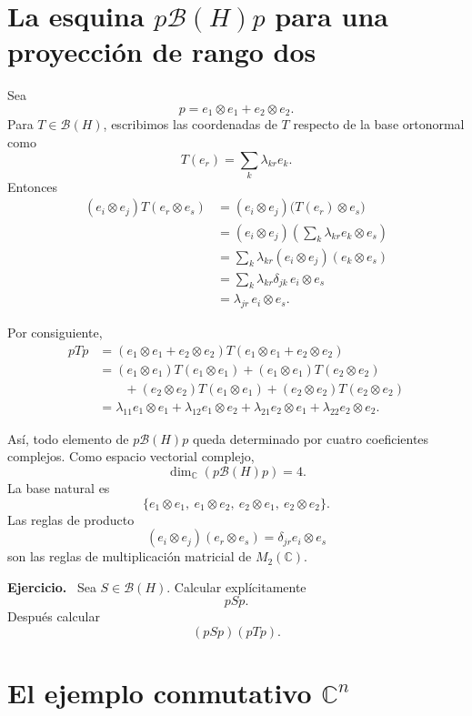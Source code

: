 \documentclass[11pt]{article}
\newcommand{\C}{\mathbb{C}}
\newcommand{\BH}{\mathcal{B}(H)}
\newenvironment{ejercicio}{\par\medskip\noindent\textbf{Ejercicio.}\ }{\par\medskip}
\begin{document}
\section{La esquina $p\mathcal{B}(H)p$ para una proyección de rango dos}

Sea
\[
p=e_1\otimes e_1+e_2\otimes e_2.
\]
Para $T\in\BH$, escribimos las coordenadas de $T$ respecto de la base ortonormal
como
\[
T(e_r)=\sum_k\lambda_{kr}e_k.
\]
Entonces
\begin{align*}
(e_i\otimes e_j)T(e_r\otimes e_s)
 &= (e_i\otimes e_j)\bigl(T(e_r)\otimes e_s\bigr)\\
 &= (e_i\otimes e_j)
    \left(\sum_k\lambda_{kr}e_k\otimes e_s\right)\\
 &=\sum_k\lambda_{kr}(e_i\otimes e_j)(e_k\otimes e_s)\\
 &=\sum_k\lambda_{kr}\delta_{jk}\,e_i\otimes e_s\\
 &=\lambda_{jr}\,e_i\otimes e_s.
\end{align*}

Por consiguiente,
\begin{align*}
pTp
 &= (e_1\otimes e_1+e_2\otimes e_2)
    T
    (e_1\otimes e_1+e_2\otimes e_2)\\
 &= (e_1\otimes e_1)T(e_1\otimes e_1)
  +(e_1\otimes e_1)T(e_2\otimes e_2)\\
 &\qquad
  +(e_2\otimes e_2)T(e_1\otimes e_1)
  +(e_2\otimes e_2)T(e_2\otimes e_2)\\
 &=\lambda_{11}e_1\otimes e_1
  +\lambda_{12}e_1\otimes e_2
  +\lambda_{21}e_2\otimes e_1
  +\lambda_{22}e_2\otimes e_2.
\end{align*}

Así, todo elemento de $p\BH p$ queda determinado por cuatro coeficientes
complejos. Como espacio vectorial complejo,
\[
\dim_{\C}(p\BH p)=4.
\]
La base natural es
\[
\{e_1\otimes e_1,\ e_1\otimes e_2,\ e_2\otimes e_1,\ e_2\otimes e_2\}.
\]
Las reglas de producto
\[
(e_i\otimes e_j)(e_r\otimes e_s)=\delta_{jr}e_i\otimes e_s
\]
son las reglas de multiplicación matricial de $M_2(\C)$.

\begin{ejercicio}
Sea $S\in\BH$. Calcular explícitamente
\[
pSp.
\]
Después calcular
\[
(pSp)(pTp).
\]
\end{ejercicio}

\section{El ejemplo conmutativo $\C^n$}
\end{document}
